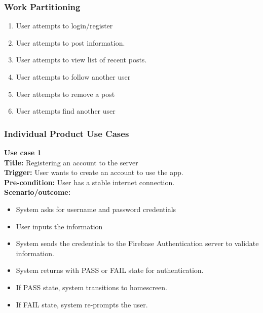 \documentclass[12pt, titlepage]{article}
\begin{document}
\subsubsection{Work Partitioning}

\begin{enumerate}
    \item User attempts to login/register
    \item User attempts to post information.
    \item User attempts to view list of recent posts.
    \item User attempts to follow another user
    \item User attempts to remove a post
    \item User attempts find another user
\end{enumerate}


\subsubsection{Individual Product Use Cases}
\textbf{Use case 1}\\
\textbf{Title:} Registering an account to the server\\
\textbf{Trigger:} User wants to create an account to use the app.\\
\textbf{Pre-condition:} User has a stable internet connection.\\
\textbf{Scenario/outcome:}
    \begin{itemize}
        \item System asks for username and password credentials
        \item User inputs the information
        \item System sends the credentials to the Firebase Authentication server to validate information.
        \item System returns with PASS or FAIL state for authentication.
        \item If PASS state, system transitions to homescreen.
        \item If FAIL state, system re-prompts the user. 
    \end{itemize}
    
\end{document}
